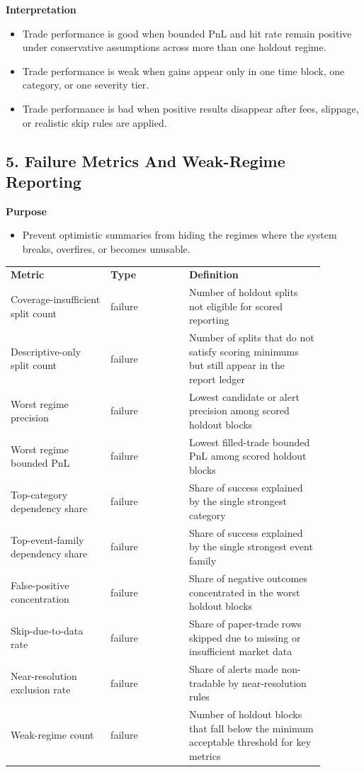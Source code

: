 \documentclass{article}
\begin{document}
\textbf{Interpretation}
\begin{itemize}
\item Trade performance is good when bounded PnL and hit rate remain positive under conservative assumptions across more than one holdout regime.
\item Trade performance is weak when gains appear only in one time block, one category, or one severity tier.
\item Trade performance is bad when positive results disappear after fees, slippage, or realistic skip rules are applied.
\end{itemize}

\subsection*{5. Failure Metrics And Weak-Regime Reporting}

\textbf{Purpose}
\begin{itemize}
\item Prevent optimistic summaries from hiding the regimes where the system breaks, overfires, or becomes unusable.
\end{itemize}

\begin{longtable}{p{0.28\linewidth}p{0.22\linewidth}p{0.38\linewidth}}
\textbf{Metric} & \textbf{Type} & \textbf{Definition} \\
Coverage-insufficient split count & failure & Number of holdout splits not eligible for scored reporting \\
Descriptive-only split count & failure & Number of splits that do not satisfy scoring minimums but still appear in the report ledger \\
Worst regime precision & failure & Lowest candidate or alert precision among scored holdout blocks \\
Worst regime bounded PnL & failure & Lowest filled-trade bounded PnL among scored holdout blocks \\
Top-category dependency share & failure & Share of success explained by the single strongest category \\
Top-event-family dependency share & failure & Share of success explained by the single strongest event family \\
False-positive concentration & failure & Share of negative outcomes concentrated in the worst holdout blocks \\
Skip-due-to-data rate & failure & Share of paper-trade rows skipped due to missing or insufficient market data \\
Near-resolution exclusion rate & failure & Share of alerts made non-tradable by near-resolution rules \\
Weak-regime count & failure & Number of holdout blocks that fall below the minimum acceptable threshold for key metrics \\
\end{longtable}
\end{document}
